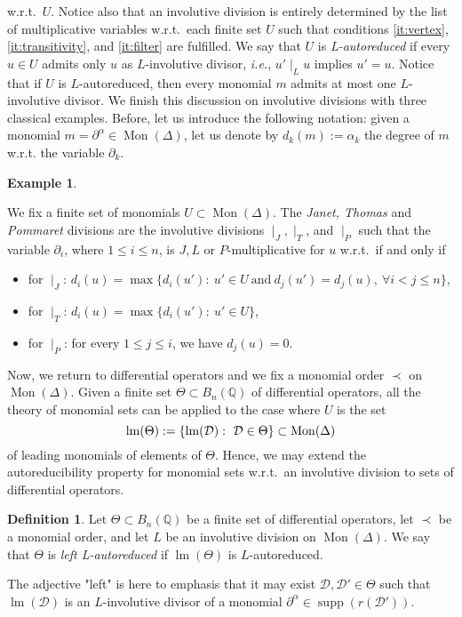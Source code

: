 \documentclass[10pt]{easychair}
\theoremstyle{definition}
\newtheorem{definition}[theorem]{Definition}
\newtheorem{example}[theorem]{Example}
\newcommand\ie{\emph{i.e.}}
\DeclareMathOperator{\supp}{supp}
\newcommand\D{\mathcal{D}}
\DeclareMathOperator{\lm}{lm}
\newcommand\Q{\mathbb{Q}}
\newcommand\Weyl[1]{B_{#1}(\Q)}
\newcommand\monBasis{\Mon(\Delta)}
\DeclareMathOperator{\Mon}{Mon}
\newcommand\divInv[1]{\mid_{#1}}
\begin{document}
w.r.t.\ $U$. Notice also that an involutive division is entirely
determined by the list of multiplicative variables w.r.t.\ each finite
set $U$ such that conditions \ref{it:vertex}, \ref{it:transitivity}, and
\ref{it:filter} are fulfilled. We say that $U$ is {\em L-autoreduced} if
every $u\in U$ admits only $u$ as $L$-involutive divisor, \ie,
$u'\divInv{L}u$ implies $u'=u$. Notice that if $U$ is $L$-autoreduced,
then every monomial $m$ admits at most one $L$-involutive divisor. We
finish this discussion on involutive divisions with three classical
examples. Before, let us introduce the following notation: given a
monomial $m=\partial^\alpha\in\monBasis$, let us denote by
$d_k(m):=\alpha_k$ the degree of $m$ w.r.t. the variable $\partial_k$.
\smallskip

\begin{example}\label{ex:involutive_division}

  We fix a finite set of monomials $U\subset\monBasis$. The
  {\em Janet, Thomas} and {\em Pommaret} divisions are the involutive
  divisions $\divInv{J},\divInv{T}$, and $\divInv{P}$ such that the
  variable $\partial_i$, where $1\leq i\leq n$, is
  $J,L$ or $P$-multiplicative for $u$ w.r.t.\ if and only if 
  \begin{itemize}
  \item for $\divInv{J}$: $d_i(u)=\max\{d_i(u'):\ u'\in U\ \text{and}\
    d_j(u')=d_j(u),\ \forall i<j\leq n\}$, 
  \item for $\divInv{T}$: $d_i(u)=\max\{d_i(u'):\ u'\in U\}$,
  \item for $\divInv{P}$: for every $1\leq j\leq i$, we have $d_j(u)=0$.
  \end{itemize}

  
\end{example}
\smallskip

Now, we return to differential operators and we fix a monomial order
$\prec$ on $\monBasis$. Given a finite set $\Theta\subset\Weyl{n}$ of
differential operators, all the theory of monomial sets can be applied to
the case where $U$ is the set 
\[\lm(\Theta):=\left\{\lm(\D):\ \D\in\Theta\right\}\subset\monBasis
\smallskip\]
of leading monomials of elements of $\Theta$. Hence, we may extend the
autoreducibility property for monomial sets w.r.t.\ an involutive
division to sets of differential operators.
\smallskip


\begin{definition}
  Let $\Theta\subset\Weyl{n}$ be a finite set of differential operators,
  let $\prec$ be a monomial order, and let $L$ be an involutive division
  on $\Mon(\Delta)$. We say that $\Theta$ is {\em left L-autoreduced} if
  $\lm(\Theta)$ is $L$-autoreduced.
\end{definition}
\smallskip
\noindent
The adjective "left" is here to emphasis that it may exist
$\D,\D'\in\Theta$ such that $\lm(\D)$ is an $L$-involutive divisor of a
monomial $\partial^\alpha\in\supp(r(\D'))$.
\medskip
\end{document}
